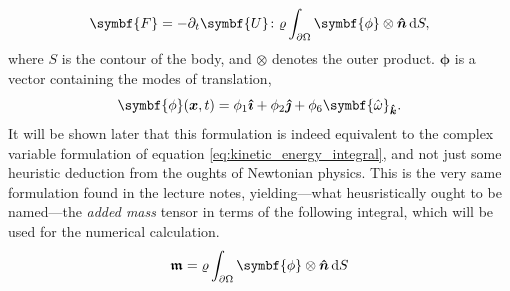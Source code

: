 \[
\symbf{F} = -\deet\symbf{U}\colon\varrho\int_{\partial\Omega} \symbf{\phi}\otimes\nhat \,\dee S,
\]
where $S$ is the contour of the body, and $\otimes$ denotes the outer product.
$\symbf{\phi}$ is a vector containing the modes of translation,
\[
    \symbf{\phi}(\xvec, t) = \phi_1 \ihat + \phi_2 \jhat + \phi_6 \symbf{\hat{\omega}}_{\khat}.
\]
It will be shown later that this formulation is indeed equivalent to the complex variable formulation of equation \eqref{eq:kinetic_energy_integral}, and not just some heuristic deduction from the oughts of Newtonian physics.
This is the very same formulation found in the lecture notes, yielding---what heusristically ought to be named---the \emph{added mass} tensor in terms of the following integral, which will be used for the numerical calculation.
\begin{equation}\label{eq:added_mass}
    \addedmass = \varrho \int_{\partial\Omega} \symbf{\phi} \otimes \nhat \,\dee S
\end{equation}
